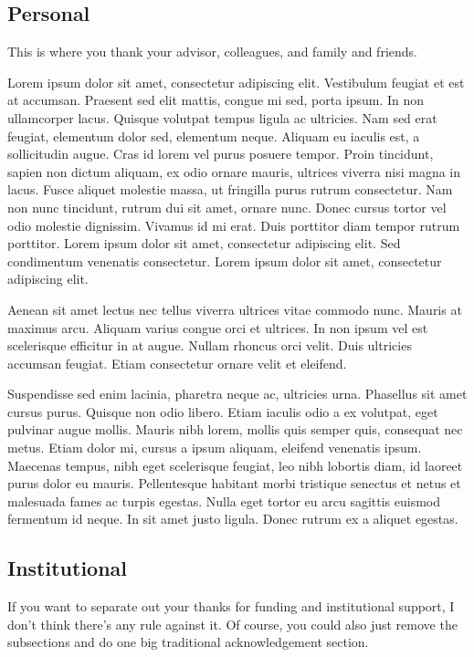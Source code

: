 \subsection*{Personal}

This is where you thank your advisor, colleagues, and family and friends.

Lorem ipsum dolor sit amet, consectetur adipiscing elit. Vestibulum feugiat et est at accumsan. Praesent sed elit mattis, congue mi sed, porta ipsum. In non ullamcorper lacus. Quisque volutpat tempus ligula ac ultricies. Nam sed erat feugiat, elementum dolor sed, elementum neque. Aliquam eu iaculis est, a sollicitudin augue. Cras id lorem vel purus posuere tempor. Proin tincidunt, sapien non dictum aliquam, ex odio ornare mauris, ultrices viverra nisi magna in lacus. Fusce aliquet molestie massa, ut fringilla purus rutrum consectetur. Nam non nunc tincidunt, rutrum dui sit amet, ornare nunc. Donec cursus tortor vel odio molestie dignissim. Vivamus id mi erat. Duis porttitor diam tempor rutrum porttitor. Lorem ipsum dolor sit amet, consectetur adipiscing elit. Sed condimentum venenatis consectetur. Lorem ipsum dolor sit amet, consectetur adipiscing elit.

Aenean sit amet lectus nec tellus viverra ultrices vitae commodo nunc. Mauris at maximus arcu. Aliquam varius congue orci et ultrices. In non ipsum vel est scelerisque efficitur in at augue. Nullam rhoncus orci velit. Duis ultricies accumsan feugiat. Etiam consectetur ornare velit et eleifend.

Suspendisse sed enim lacinia, pharetra neque ac, ultricies urna. Phasellus sit amet cursus purus. Quisque non odio libero. Etiam iaculis odio a ex volutpat, eget pulvinar augue mollis. Mauris nibh lorem, mollis quis semper quis, consequat nec metus. Etiam dolor mi, cursus a ipsum aliquam, eleifend venenatis ipsum. Maecenas tempus, nibh eget scelerisque feugiat, leo nibh lobortis diam, id laoreet purus dolor eu mauris. Pellentesque habitant morbi tristique senectus et netus et malesuada fames ac turpis egestas. Nulla eget tortor eu arcu sagittis euismod fermentum id neque. In sit amet justo ligula. Donec rutrum ex a aliquet egestas.

\subsection*{Institutional}

If you want to separate out your thanks for funding and institutional support, I don't think there's any rule against it.  Of course, you could also just remove the subsections and do one big traditional acknowledgement section.

